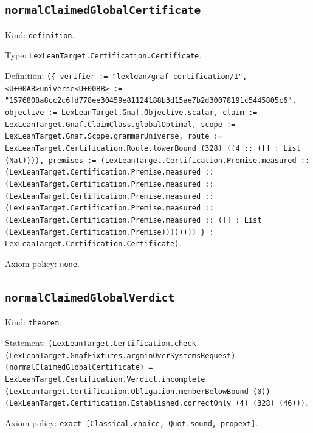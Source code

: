 \documentclass[11pt]{article}
\begin{document}
\subsection*{\texttt{normalClaimedGlobalCertificate}}
\noindent Kind: \texttt{definition}.\par
\noindent Type: \texttt{LexLeanTarget.Certification.Certificate}.\par
\noindent Definition: \texttt{(\{ verifier := "lexlean/gnaf-certification/1", <U+00AB>universe<U+00BB> := "1576808a8cc2c6fd778ee30459e81124188b3d15ae7b2d30078191c5445805c6", objective := LexLeanTarget.Gnaf.Objective.scalar, claim := LexLeanTarget.Gnaf.ClaimClass.globalOptimal, scope := LexLeanTarget.Gnaf.Scope.grammarUniverse, route := LexLeanTarget.Certification.Route.lowerBound (328) ((4 :: ([] : List (Nat)))), premises := (LexLeanTarget.Certification.Premise.measured :: (LexLeanTarget.Certification.Premise.measured :: (LexLeanTarget.Certification.Premise.measured :: (LexLeanTarget.Certification.Premise.measured :: (LexLeanTarget.Certification.Premise.measured :: (LexLeanTarget.Certification.Premise.measured :: ([] : List (LexLeanTarget.Certification.Premise)))))))) \} : LexLeanTarget.Certification.Certificate)}.\par
\noindent Axiom policy: \texttt{none}.\par
\subsection*{\texttt{normalClaimedGlobalVerdict}}
\noindent Kind: \texttt{theorem}.\par
\noindent Statement: \texttt{(LexLeanTarget.Certification.check (LexLeanTarget.GnafFixtures.argminOverSystemsRequest) (normalClaimedGlobalCertificate) = LexLeanTarget.Certification.Verdict.incomplete (LexLeanTarget.Certification.Obligation.memberBelowBound (0)) (LexLeanTarget.Certification.Established.correctOnly (4) (328) (46)))}.\par
\noindent Axiom policy: \texttt{exact [Classical.choice, Quot.sound, propext]}.\par
\end{document}
